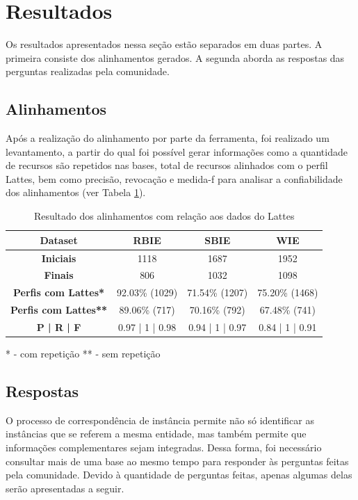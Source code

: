 \section{Resultados}
\label{sec:resultados}
Os resultados apresentados nessa seção estão separados em duas partes. A primeira consiste dos alinhamentos gerados. A segunda aborda as respostas das perguntas realizadas pela comunidade.

\subsection{Alinhamentos}
Após a realização do alinhamento por parte da ferramenta, foi realizado um levantamento, a partir do qual foi possível gerar informações como a quantidade de recursos são repetidos nas bases, total de recursos alinhados com o perfil Lattes, bem como precisão, revocação e medida-f \cite{goutte2005probabilistic} para analisar a confiabilidade dos alinhamentos (ver Tabela \ref{tab:case_study}).

\begin{table}[!ht]
	\centering
	\caption{ Resultado dos alinhamentos com relação aos dados do Lattes}
	\label{tab:case_study}
	\begin{tabular}{|c|c|c|c|}
		\hline
		\textbf{Dataset}	&	\textbf{RBIE}	&	\textbf{SBIE}	&	\textbf{WIE}  \\ \hline
		\textbf{Iniciais}	&	1118	&	1687	&	1952 \\ \hline
		\textbf{Finais}	&	806	&	1032	&	1098 \\ \hline
		\textbf{Perfis com Lattes*}	&	92.03\% (1029)	&	71.54\% (1207)	&	75.20\% (1468) \\ \hline
		\textbf{Perfis com Lattes**}	&	89.06\% (717)	&	70.16\% (792)	&	67.48\% (741) \\ \hline
		\textbf{P | R | F}	&	0.97 | 1 | 0.98	&	0.94 | 1 | 0.97 	&	0.84 | 1 | 0.91 \\ \hline
	\end{tabular}
\end{table}
* - com repetição
** - sem repetição

\subsection{Respostas}
O processo de correspondência de instância permite não só identificar as instâncias que se referem a mesma entidade, mas também permite que informações complementares sejam integradas. Dessa forma, foi necessário consultar mais de uma base ao mesmo tempo para responder às perguntas feitas pela comunidade. Devido à quantidade de perguntas feitas, apenas algumas delas serão apresentadas a seguir.

